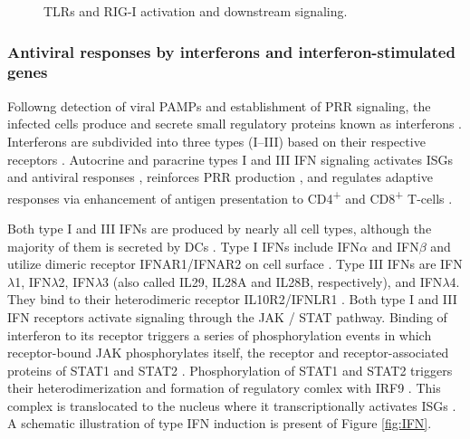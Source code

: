 		\begin{figure}[h]
			\centering
			\caption{\glspl{TLR} and \gls{RIG-I} activation and downstream signaling.} \label{fig:detection}
		\end{figure}	
		
		
		\subsubsection{Antiviral responses by interferons and interferon-stimulated genes}
		
		Followng detection of viral \gls{PAMP}s and establishment of \gls{PRR} signaling, the infected cells produce and secrete small regulatory proteins known as interferons \parencite{Fensterl2009}. Interferons are subdivided into three types (I--III) based on their respective receptors  \parencite{Branca1981, Sheppard2003}. Autocrine and paracrine types I and III \gls{IFN} signaling activates \gls{ISG}s and antiviral responses \parencite{Kotenko2003, Garcia-Sastre2006}, reinforces \gls{PRR} production \parencite{Pothlichet2013}, and regulates adaptive responses via enhancement of antigen presentation to CD4\textsuperscript{+} and CD8\textsuperscript{+} T-cells \parencite{Zietara2009}.
	
		Both type I and III \glspl{IFN} are produced by nearly all cell types, although the majority of them is secreted by \glspl{DC} \parencite{Siegal1999, Odendall2014}. Type I \glspl{IFN} include \gls{IFN}$\alpha$ and \gls{IFN}$\beta$ and utilize dimeric receptor IFNAR1/IFNAR2 on cell surface \parencite{Mogensen1999}. Type III \glspl{IFN} are \gls{IFN}$\lambda$1, \gls{IFN}$\lambda$2, \gls{IFN}$\lambda$3 (also called \gls{IL}29, \gls{IL}28A and \gls{IL}28B, respectively), and \gls{IFN}$\lambda$4. They bind to their heterodimeric receptor IL10R2/IFNLR1 \parencite{Kotenko2003, Sheppard2003}. Both type I and III \gls{IFN} receptors activate signaling through the \gls{JAK} / \gls{STAT} pathway. Binding of interferon to its receptor triggers a series of phosphorylation events in which receptor-bound \gls{JAK} phosphorylates itself, the receptor and receptor-associated proteins of \gls{STAT}1 and \gls{STAT}2 \parencite{VanBoxel-Dezaire2006}. Phosphorylation of \gls{STAT}1 and \gls{STAT}2 triggers their heterodimerization and formation of regulatory comlex with \gls{IRF}9 \parencite{Fu1990}. This complex is translocated to the nucleus where it transcriptionally activates \glspl{ISG} \parencite{Levy1988}. A schematic illustration of type \gls{IFN} induction is present of Figure \ref{fig:IFN}.
		
